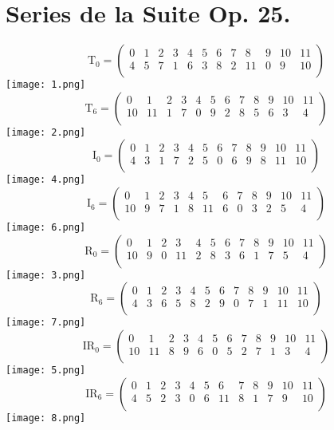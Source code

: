 \chapter{Series de la Suite Op. 25.}
	\label{app:series}
	
	\newpage
	$$\text{T}_0=\left(\begin{matrix}0&1&2&3&4&5&6&7&8&9&10&11\\4&5&7&1&6&3&8&2&11&0&9&10\\\end{matrix}\right)$$
	\texttt{[image: 1.png]}
	\vspace{1cm}
	$$\text{T}_6=\left(\begin{matrix}0&1&2&3&4&5&6&7&8&9&10&11\\10&11&1&7&0&9&2&8&5&6&3&4\\\end{matrix}\right)$$
	\texttt{[image: 2.png]}
	\vspace{1cm}
	$$\text{I}_0=\left(\begin{matrix}0&1&2&3&4&5&6&7&8&9&10&11\\4&3&1&7&2&5&0&6&9&8&11&10\\\end{matrix}\right)$$
	\texttt{[image: 4.png]}
	\vspace{1cm}
	$$\text{I}_6=\left(\begin{matrix}0&1&2&3&4&5&6&7&8&9&10&11\\10&9&7&1&8&11&6&0&3&2&5&4\\\end{matrix}\right)$$
	\texttt{[image: 6.png]}
	\newpage
	$$\text{R}_0=\left(\begin{matrix}0&1&2&3&4&5&6&7&8&9&10&11\\10&9&0&11&2&8&3&6&1&7&5&4\\\end{matrix}\right)$$
	\texttt{[image: 3.png]}
	\vspace{1cm}
	$$\text{R}_6=\left(\begin{matrix}0&1&2&3&4&5&6&7&8&9&10&11\\4&3&6&5&8&2&9&0&7&1&11&10\\\end{matrix}\right)$$
	\texttt{[image: 7.png]}
	\vspace{1cm}
	$$\text{IR}_0=\left(\begin{matrix}0&1&2&3&4&5&6&7&8&9&10&11\\10&11&8&9&6&0&5&2&7&1&3&4\\\end{matrix}\right)$$
	\texttt{[image: 5.png]}
	\vspace{1cm}
	$$\text{IR}_6=\left(\begin{matrix}0&1&2&3&4&5&6&7&8&9&10&11\\4&5&2&3&0&6&11&8&1&7&9&10\\\end{matrix}\right)$$
	\texttt{[image: 8.png]}